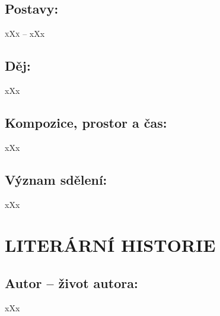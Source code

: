 \documentclass[A4paper]{extarticle} %
\begin{document}
\subsection*{Postavy:}
\noindent 
\textsc{xXx --} xXx \\

\subsection*{Děj:}
\noindent 
xXx

\subsection*{Kompozice, prostor a čas:}
\noindent 
xXx

\subsection*{Význam sdělení:}
\noindent 
xXx

\section*{LITERÁRNÍ HISTORIE}





\subsection*{Autor {\ssmall -- život autora:}}
\noindent 
xXx

\end{document}
